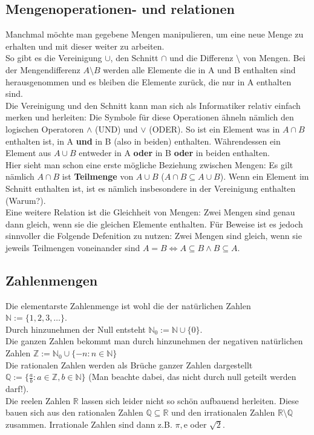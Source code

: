 \documentclass[parskip=full]{scrartcl}
\begin{document}
    \subsection{Mengenoperationen- und relationen}
        Manchmal möchte man gegebene Mengen manipulieren, um eine neue Menge zu erhalten und mit dieser weiter zu arbeiten.
        \\So gibt es die Vereinigung \(\cup\), den Schnitt \(\cap\) und die Differenz \(\setminus\) von Mengen. 
        Bei der Mengendifferenz \(A \setminus B\) werden alle Elemente die in A und B enthalten sind herausgenommen
        und es bleiben die Elemente zurück, die nur in A enthalten sind.
        \\Die Vereinigung und den Schnitt kann man sich als Informatiker relativ einfach merken und herleiten:
        Die Symbole für diese Operationen ähneln nämlich den logischen Operatoren \(\wedge\) (UND) und \(\vee\) (ODER).
        So ist ein Element was in \(A \cap B\) enthalten ist, in A \textbf{und} in B (also in beiden) enthalten. 
        Währendessen ein Element aus \(A \cup B\) entweder in A \textbf{oder} in B \textbf{oder} in beiden enthalten.
        \\Hier sieht man schon eine erste mögliche Beziehung zwischen Mengen: 
        Es gilt nämlich \(A \cap B\) ist \textbf{Teilmenge} von \(A \cup B\) \quad (\(A \cap B \subseteq A \cup B\)).
        Wenn ein Element im Schnitt enthalten ist, ist es nämlich insbesondere in der Vereinigung enthalten (Warum?).
        \\Eine weitere Relation ist die Gleichheit von Mengen: Zwei Mengen sind genau dann gleich, wenn sie die gleichen Elemente enthalten.
        Für Beweise ist es jedoch sinnvoller die Folgende Defenition zu nutzen: 
        Zwei Mengen sind gleich, wenn sie jeweils Teilmengen voneinander sind \quad \(A = B \iff A \subseteq B \wedge B \subseteq A\).
        
    \subsection{Zahlenmengen}
        Die elementarste Zahlenmenge ist wohl die der natürlichen Zahlen \(\mathbb{N} := \{1, 2, 3, \dots\}\). 
        \\Durch hinzunehmen der Null entsteht \(\mathbb{N}_0 := \mathbb{N} \cup \{0\}\).
        \\Die ganzen Zahlen bekommt man durch hinzunehmen der negativen natürlichen Zahlen \(\mathbb{Z} := \mathbb{N}_0 \cup \{-n : n \in \mathbb{N}\}\)
        \\Die rationalen Zahlen werden als Brüche ganzer Zahlen dargestellt
        \\\(\mathbb{Q} := \{\frac{a}{b} : a \in \mathbb{Z}, b \in \mathbb{N}\}\)
        \quad(Man beachte dabei, das nicht durch null geteilt werden darf!).
        \\Die reelen Zahlen \(\mathbb{R}\) lassen sich leider nicht so schön aufbauend herleiten.
        Diese bauen sich aus den rationalen Zahlen \(\mathbb{Q} \subseteq \mathbb{R}\) und den irrationalen Zahlen \(\mathbb{R} \setminus \mathbb{Q}\) zusammen.
        Irrationale Zahlen sind dann z.B. \(\pi, \mathrm{e}\) oder \(\sqrt{2}\).
\end{document}
